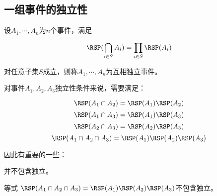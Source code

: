 \subsection{一组事件的独立性}

设$A_1, \cdots, A_n$为$n$个事件，满足

$$\RSP(\bigcap_{i \in S} A_i) = \prod_{i \in S} \RSP(A_i)$$

对任意子集$S$成立，则称$A_1, \cdots, A_n$为互相独立事件。

对事件$A_1, A_2, A_3$独立性条件来说，需要满足：

$$\RSP(A_1 \cap A_2) = \RSP(A_1)\RSP(A_2)$$
$$\RSP(A_1 \cap A_3) = \RSP(A_1)\RSP(A_3)$$
$$\RSP(A_2 \cap A_3) = \RSP(A_2)\RSP(A_3)$$
$$\RSP(A_1 \cap A_2 \cap A_3) = \RSP(A_1)\RSP(A_2)\RSP(A_3)$$

因此有重要的一些：

\begin{ul}
  \item {}并不包含独立。
  \item 等式 $\RSP(A_1 \cap A_2 \cap A_3) = \RSP(A_1)\RSP(A_2)\RSP(A_3)$不包含独立。
\end{ul}